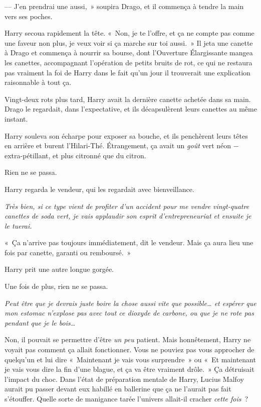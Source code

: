 --- J'en prendrai une aussi,~» soupira Drago, et il commença à tendre la main vers ses poches.

Harry secoua rapidement la tête. «~Non, je te l'offre, et ça ne compte pas comme une faveur non plus, je veux voir si ça marche sur toi aussi.~» Il jeta une canette à Drago et commença à nourrir sa bourse, dont l'Ouverture Élargissante mangea les canettes, accompagnant l'opération de petits bruits de rot, ce qui ne restaura pas vraiment la foi de Harry dans le fait qu'un jour il trouverait une explication raisonnable à tout ça.

Vingt-deux rots plus tard, Harry avait la dernière canette achetée dans sa main. Drago le regardait, dans l'expectative, et ils décapsulèrent leurs canettes au même instant.

Harry souleva son écharpe pour exposer sa bouche, et ils penchèrent leurs têtes en arrière et burent l'Hilari-Thé. Étrangement, ça avait un \emph{goût} vert néon − extra-pétillant, et plus citronné que du citron.

Rien ne se passa.

Harry regarda le vendeur, qui les regardait avec bienveillance.

\emph{Très bien, si ce type vient de profiter d'un accident pour me vendre vingt-quatre canettes de soda vert, je vais applaudir son esprit d'entrepreneuriat et ensuite je le tuerai.}

«~Ça n'arrive pas toujours immédiatement, dit le vendeur. Mais ça aura lieu une fois par canette, garanti ou remboursé.~»

Harry prit une autre longue gorgée.

Une fois de plus, rien ne se passa.

\emph{Peut être que je devrais juste boire la chose aussi vite que possible… et espérer que mon estomac n'explose pas avec tout ce dioxyde de carbone, ou que je ne rote pas pendant que je le bois…}

Non, il pouvait se permettre d'être \emph{un peu} patient. Mais honnêtement, Harry ne voyait pas comment ça allait fonctionner. Vous ne pouviez pas vous approcher de quelqu'un et lui dire «~Maintenant je vais vous surprendre~» ou «~Et maintenant je vais vous dire la fin d'une blague, et ça va être vraiment drôle.~» Ça détruisait l'impact du choc. Dans l'état de préparation mentale de Harry, Lucius Malfoy aurait pu passer devant eux habillé en ballerine que ça ne l'aurait pas fait s'étouffer. Quelle sorte de manigance tarée l'univers allait-il cracher \emph{cette fois}~?

